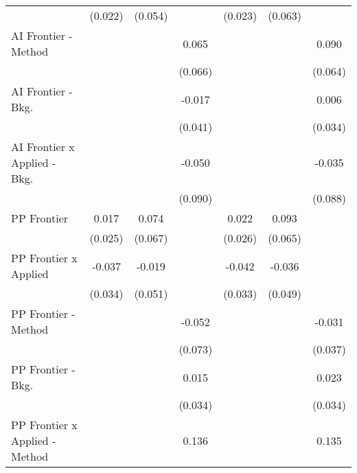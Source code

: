 \begin{tabular}{lcccccc}
                                  & (0.022)       & (0.054)      &              & (0.023)       & (0.063)       &   \\   
   AI Frontier - Method           &               &              & 0.065        &               &               & 0.090\\   
                                  &               &              & (0.066)      &               &               & (0.064)\\   
   AI Frontier - Bkg.             &               &              & -0.017       &               &               & 0.006\\   
                                  &               &              & (0.041)      &               &               & (0.034)\\   
   AI Frontier x Applied - Bkg.   &               &              & -0.050       &               &               & -0.035\\   
                                  &               &              & (0.090)      &               &               & (0.088)\\   
   PP Frontier                    & 0.017         & 0.074        &              & 0.022         & 0.093         &   \\   
                                  & (0.025)       & (0.067)      &              & (0.026)       & (0.065)       &   \\   
   PP Frontier x Applied          & -0.037        & -0.019       &              & -0.042        & -0.036        &   \\   
                                  & (0.034)       & (0.051)      &              & (0.033)       & (0.049)       &   \\   
   PP Frontier - Method           &               &              & -0.052       &               &               & -0.031\\   
                                  &               &              & (0.073)      &               &               & (0.037)\\   
   PP Frontier - Bkg.             &               &              & 0.015        &               &               & 0.023\\   
                                  &               &              & (0.034)      &               &               & (0.034)\\   
   PP Frontier x Applied - Method &               &              & 0.136        &               &               & 0.135\\   

\end{tabular}
